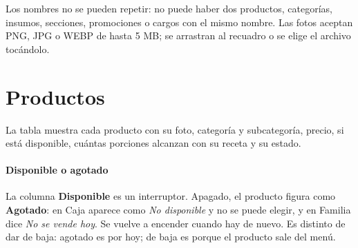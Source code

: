
Los nombres no se pueden repetir: no puede haber dos productos, categorías, insumos, secciones, promociones o cargos con el mismo nombre. Las fotos aceptan PNG, JPG o WEBP de hasta 5 MB; se arrastran al recuadro o se elige el archivo tocándolo.

\section{Productos}

La tabla muestra cada producto con su foto, categoría y subcategoría, precio, si está disponible, cuántas porciones alcanzan con su receta y su estado.


\paragraph{Disponible o agotado} La columna \textbf{Disponible} es un interruptor. Apagado, el producto figura como \textbf{Agotado}: en Caja aparece como \textit{No disponible} y no se puede elegir, y en Familia dice \textit{No se vende hoy}. Se vuelve a encender cuando hay de nuevo. Es distinto de dar de baja: agotado es por hoy; de baja es porque el producto sale del menú.

